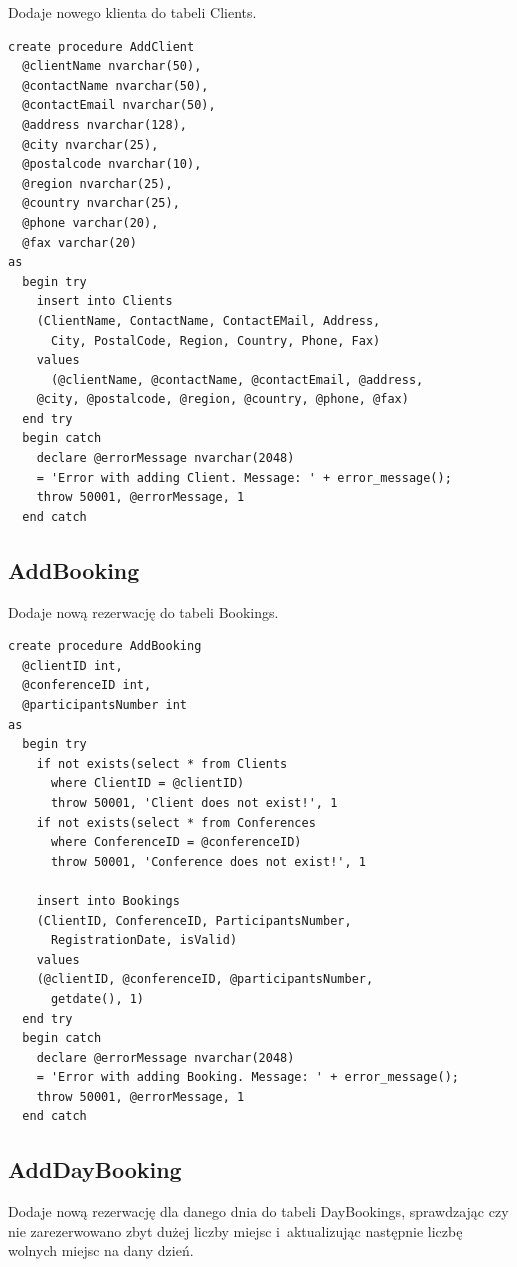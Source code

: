 \documentclass[12pt, a4paper]{mwrep}
\begin{document}
\noindent Dodaje nowego klienta do tabeli Clients.

\begin{lstlisting}
create procedure AddClient
  @clientName nvarchar(50),
  @contactName nvarchar(50),
  @contactEmail nvarchar(50),
  @address nvarchar(128),
  @city nvarchar(25),
  @postalcode nvarchar(10),
  @region nvarchar(25),
  @country nvarchar(25),
  @phone varchar(20),
  @fax varchar(20)
as
  begin try
    insert into Clients
    (ClientName, ContactName, ContactEMail, Address, 
      City, PostalCode, Region, Country, Phone, Fax)
    values
      (@clientName, @contactName, @contactEmail, @address, 
    @city, @postalcode, @region, @country, @phone, @fax)
  end try
  begin catch
    declare @errorMessage nvarchar(2048)
    = 'Error with adding Client. Message: ' + error_message();
    throw 50001, @errorMessage, 1
  end catch
\end{lstlisting}

\subsection{AddBooking}

\noindent Dodaje nową rezerwację do tabeli Bookings.

\begin{lstlisting}
create procedure AddBooking
  @clientID int,
  @conferenceID int,
  @participantsNumber int
as
  begin try
    if not exists(select * from Clients 
      where ClientID = @clientID)
      throw 50001, 'Client does not exist!', 1
    if not exists(select * from Conferences 
      where ConferenceID = @conferenceID)
      throw 50001, 'Conference does not exist!', 1

    insert into Bookings
    (ClientID, ConferenceID, ParticipantsNumber, 
      RegistrationDate, isValid)
    values
    (@clientID, @conferenceID, @participantsNumber, 
      getdate(), 1)
  end try
  begin catch
    declare @errorMessage nvarchar(2048)
    = 'Error with adding Booking. Message: ' + error_message();
    throw 50001, @errorMessage, 1
  end catch
\end{lstlisting}

\subsection{AddDayBooking}

\noindent Dodaje nową rezerwację dla danego dnia do tabeli DayBookings, sprawdzając czy nie zarezerwowano zbyt dużej liczby miejsc i~aktualizując następnie liczbę wolnych miejsc na dany dzień.
\end{document}
